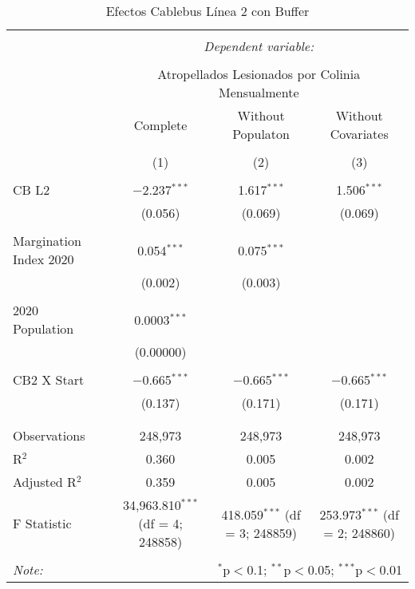 
\begin{table}[!htbp] \centering 
  \caption{Efectos Cablebus Línea 2 con Buffer} 
  \label{} 
\begin{tabular}{@{\extracolsep{5pt}}lccc} 
\\[-1.8ex]\hline 
\hline \\[-1.8ex] 
 & \multicolumn{3}{c}{\textit{Dependent variable:}} \\ 
\cline{2-4} 
\\[-1.8ex] & \multicolumn{3}{c}{Atropellados Lesionados por Colinia Mensualmente} \\ 
 & Complete & Without Populaton & Without Covariates \\ 
\\[-1.8ex] & (1) & (2) & (3)\\ 
\hline \\[-1.8ex] 
 CB L2 & $-$2.237$^{***}$ & 1.617$^{***}$ & 1.506$^{***}$ \\ 
  & (0.056) & (0.069) & (0.069) \\ 
  & & & \\ 
 Margination Index 2020 & 0.054$^{***}$ & 0.075$^{***}$ &  \\ 
  & (0.002) & (0.003) &  \\ 
  & & & \\ 
 2020 Population & 0.0003$^{***}$ &  &  \\ 
  & (0.00000) &  &  \\ 
  & & & \\ 
 CB2 X Start & $-$0.665$^{***}$ & $-$0.665$^{***}$ & $-$0.665$^{***}$ \\ 
  & (0.137) & (0.171) & (0.171) \\ 
  & & & \\ 
\hline \\[-1.8ex] 
Observations & 248,973 & 248,973 & 248,973 \\ 
R$^{2}$ & 0.360 & 0.005 & 0.002 \\ 
Adjusted R$^{2}$ & 0.359 & 0.005 & 0.002 \\ 
F Statistic & 34,963.810$^{***}$ (df = 4; 248858) & 418.059$^{***}$ (df = 3; 248859) & 253.973$^{***}$ (df = 2; 248860) \\ 
\hline 
\hline \\[-1.8ex] 
\textit{Note:}  & \multicolumn{3}{r}{$^{*}$p$<$0.1; $^{**}$p$<$0.05; $^{***}$p$<$0.01} \\ 
\end{tabular} 
\end{table} 
